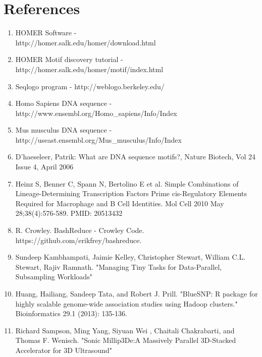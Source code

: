 \documentclass{acm_proc_article-sp}
\begin{document}
\section{References}
\begin{enumerate}
\item{HOMER Software - \\http://homer.salk.edu/homer/download.html}
\item{HOMER Motif discovery  tutorial - \\http://homer.salk.edu/homer/motif/index.html}
\item{Seqlogo program - http://weblogo.berkeley.edu/}
\item{Homo Sapiens DNA sequence - \\http://www.ensembl.org/Homo\_sapiens/Info/Index}
\item{Mus musculus DNA sequence - \\http://useast.ensembl.org/Mus\_musculus/Info/Index}

\item{D'haeseleer, Patrik: What are DNA sequence motifs?, Nature Biotech, Vol 24 Issue 4, April 2006}

\item{Heinz S, Benner C, Spann N, Bertolino E et al. Simple Combinations of Lineage-Determining Transcription Factors Prime cis-Regulatory Elements Required for Macrophage and B Cell Identities. Mol Cell 2010 May 28;38(4):576-589. PMID: 20513432}

\item{R. Crowley. BashReduce - Crowley Code.\\ https://github.com/erikfrey/bashreduce.}

\item{Sundeep Kambhampati, Jaimie Kelley, Christopher Stewart, William C.L. Stewart, Rajiv Ramnath. "Managing Tiny Tasks for Data-Parallel, Subsampling Workloads"}

\item{Huang, Hailiang, Sandeep Tata, and Robert J. Prill. "BlueSNP: R package for highly scalable genome-wide association studies using Hadoop clusters." Bioinformatics 29.1 (2013): 135-136.}

\item{Richard Sampson, Ming Yang, Siyuan Wei , Chaitali Chakrabarti, and Thomas F. Wenisch. "Sonic Millip3De:A Massively Parallel 3D-Stacked Accelerator for 3D Ultrasound"}


\end{enumerate}






\balancecolumns
\end{document}

